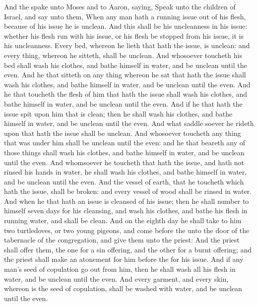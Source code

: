 \begin{biblechapter} %
 And the \LORD spake unto Moses and to Aaron, saying,
\verse Speak unto the children of Israel, and say unto them, When any man hath a running issue out of his flesh, because of his issue he is unclean.
\verse And this shall be his uncleanness in his issue: whether his flesh run with his issue, or his flesh be stopped from his issue, it is his uncleanness.
\verse Every bed, whereon he lieth that hath the issue, is unclean: and every thing, whereon he sitteth, shall be unclean.
\verse And whosoever toucheth his bed shall wash his clothes, and bathe himself in water, and be unclean until the even.
\verse And he that sitteth on any thing whereon he sat that hath the issue shall wash his clothes, and bathe himself in water, and be unclean until the even.
\verse And he that toucheth the flesh of him that hath the issue shall wash his clothes, and bathe himself in water, and be unclean until the even.
\verse And if he that hath the issue spit upon him that is clean; then he shall wash his clothes, and bathe himself in water, and be unclean until the even.
\verse And what saddle soever he rideth upon that hath the issue shall be unclean.
\verse And whosoever toucheth any thing that was under him shall be unclean until the even: and he that beareth any of those things shall wash his clothes, and bathe himself in water, and be unclean until the even.
\verse And whomsoever he toucheth that hath the issue, and hath not rinsed his hands in water, he shall wash his clothes, and bathe himself in water, and be unclean until the even.
\verse And the vessel of earth, that he toucheth which hath the issue, shall be broken: and every vessel of wood shall be rinsed in water.
\verse And when he that hath an issue is cleansed of his issue; then he shall number to himself seven days for his cleansing, and wash his clothes, and bathe his flesh in running water, and shall be clean.
\verse And on the eighth day he shall take to him two turtledoves, or two young pigeons, and come before the \LORD unto the door of the tabernacle of the congregation, and give them unto the priest:
\verse And the priest shall offer them, the one for a sin offering, and the other for a burnt offering; and the priest shall make an atonement for him before the \LORD for his issue.
\verse And if any man's seed of copulation go out from him, then he shall wash all his flesh in water, and be unclean until the even.
\verse And every garment, and every skin, whereon is the seed of copulation, shall be washed with water, and be unclean until the even.

\end{biblechapter}
